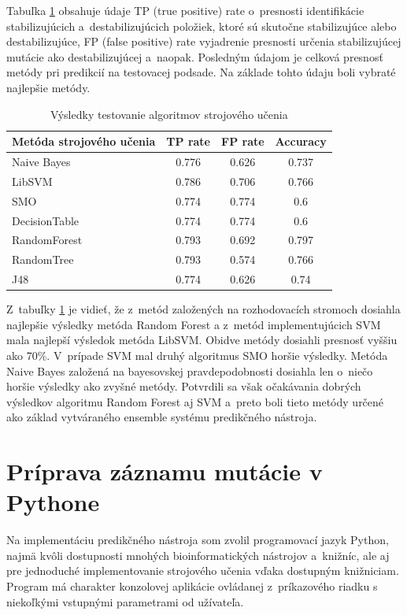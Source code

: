 Tabuľka \ref{testovanie} obsahuje údaje TP (true positive) rate o~presnosti identifikácie stabilizujúcich a~destabilizujúcich položiek, ktoré sú skutočne stabilizujúce alebo destabilizujúce, FP (false positive) rate vyjadrenie presnosti určenia stabilizujúcej mutácie ako destabilizujúcej a~naopak. Posledným údajom je celková presnosť metódy pri predikcií na testovacej podsade. Na základe tohto údaju boli vybraté najlepšie metódy.

\begin{table}[H]
	\centering
	\begin{tabular}{ | l | c | c | c| }
		\hline 
		Metóda strojového učenia & TP rate & FP rate & Accuracy \\ \hline
		Naive Bayes & 0.776 & 0.626 & 0.737 \\ \hline
		LibSVM &  0.786   & 0.706   & 0.766  \\ \hline
		SMO & 0.774 & 0.774 & 0.6\\ \hline
		DecisionTable & 0.774 & 0.774 & 0.6\\ \hline
		RandomForest & 0.793 & 0.692 & 0.797\\ \hline
		RandomTree & 0.793 & 0.574 & 0.766\\ \hline
		J48 & 0.774 & 0.626 & 0.74\\ \hline		
	\end{tabular}
	\caption {Výsledky testovanie algoritmov strojového učenia} \label{testovanie} 
\end{table}

Z~tabuľky \ref{testovanie} je vidieť, že z~metód založených na rozhodovacích stromoch dosiahla najlepšie výsledky metóda Random Forest a z~metód implementujúcich SVM mala najlepší výsledok metóda LibSVM. Obidve metódy dosiahli presnosť vyššiu ako 70\%. V~prípade SVM mal druhý algoritmus SMO horšie výsledky. Metóda Naive Bayes založená na bayesovskej pravdepodobnosti dosiahla len o~niečo horšie výsledky ako zvyšné metódy. Potvrdili sa však očakávania dobrých výsledkov algoritmu Random Forest aj SVM a~preto boli tieto metódy určené ako základ vytváraného ensemble systému predikčného nástroja.

\section{Príprava záznamu mutácie v Pythone}

Na implementáciu predikčného nástroja som zvolil programovací jazyk Python, najmä kvôli dostupnosti mnohých bioinformatických nástrojov a~knižníc, ale aj pre jednoduché implementovanie strojového učenia vďaka dostupným knižniciam. Program má charakter konzolovej aplikácie ovládanej z~príkazového riadku s niekoľkými vstupnými parametrami od užívateľa.


